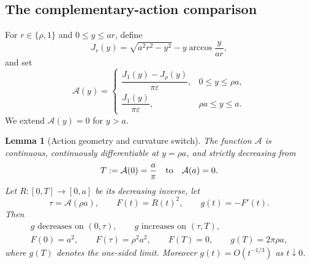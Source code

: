 \documentclass[11pt]{article}
\numberwithin{equation}{section}
\newtheorem{lemma}[theorem]{Lemma}
\theoremstyle{definition}
\theoremstyle{remark}
\begin{document}
\subsection{The complementary-action comparison}

For \(r\in\{\rho,1\}\) and \(0\leq y\leq ar\), define
\begin{equation}
  J_r(y)=\sqrt{a^2r^2-y^2}
          -y\arccos\frac{y}{ar},
  \label{thin:eq-J-action}
\end{equation}
and set
\begin{equation}
  \mathcal A(y)=
  \begin{cases}
  \dfrac{J_1(y)-J_\rho(y)}{\pi\varepsilon},
    &0\leq y\leq\rho a,\\[6pt]
  \dfrac{J_1(y)}{\pi\varepsilon},
    &\rho a\leq y\leq a.
  \end{cases}
  \label{thin:eq-action-definition}
\end{equation}
We extend \(\mathcal A(y)=0\) for \(y>a\).

\begin{lemma}[Action geometry and curvature switch]
\label{thin:lem-action-geometry}
The function \(\mathcal A\) is continuous, continuously differentiable at
\(y=\rho a\), and strictly decreasing from
\[
  T:=\mathcal A(0)=\frac a\pi
  \quad\hbox{to}\quad \mathcal A(a)=0.
\]
Let \(R:[0,T]\to[0,a]\) be its decreasing inverse, let
\[
  \tau=\mathcal A(\rho a),
  \qquad F(t)=R(t)^2,
  \qquad g(t)=-F'(t).
\]
Then
\begin{equation}
\begin{gathered}
  g\text{ decreases on }(0,\tau),
  \qquad g\text{ increases on }(\tau,T),\\
  F(0)=a^2,
  \qquad F(\tau)=\rho^2a^2,
  \qquad F(T)=0,
  \qquad g(T)=2\pi\rho a,
\end{gathered}
  \label{thin:eq-action-geometry}
\end{equation}
where \(g(T)\) denotes the one-sided limit.  Moreover \(g(t)=O(t^{-1/3})\)
as \(t\downarrow0\).
\end{lemma}
\end{document}
